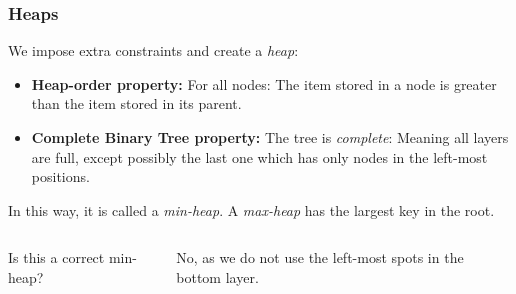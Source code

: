 \begin{frame}
	\frametitle{Heaps}
			We impose extra constraints and create a \textit{heap}:
			\begin{itemize}
				\item \textbf{Heap-order property:} For all nodes: The item stored in a node is greater than the item stored in its parent.
				\item \textbf{Complete Binary Tree property:} The tree is \textit{complete}: Meaning all layers are full, except possibly the last one which has only
					nodes in the left-most positions. 
			\end{itemize}
			
			In this way, it is called a \textit{min-heap}. A \textit{max-heap} has the largest key in the root.
		
		\begin{columns}


				Is this a correct min-heap?
			
				No, as we do not use the left-most spots in the bottom layer.
		\end{columns}
\end{frame}

